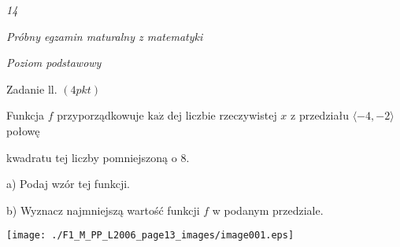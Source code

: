 \documentclass[a4paper,12pt]{article}
\begin{document}
{\it 14}

{\it Próbny egzamin maturalny z matematyki}

{\it Poziom podstawowy}

Zadanie ll. $(4pkt)$

Funkcja $f$ przyporządkowuje $\mathrm{k}\mathrm{a}\dot{\mathrm{z}}$ dej liczbie rzeczywistej $x$ z przedziału $\langle-4,-2\rangle$ połowę

kwadratu tej liczby pomniejszoną o 8.

a) Podaj wzór tej funkcji.

b) Wyznacz najmniejszą wartość funkcji $f$ w podanym przedziale.
\begin{center}
\texttt{[image: ./F1\_M\_PP\_L2006\_page13\_images/image001.eps]}
\end{center}
\end{document}
